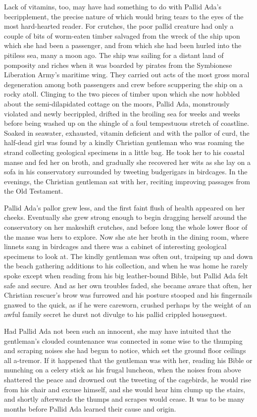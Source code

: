 Lack of vitamins, too, may have had something to do with Pallid Ada's becripplement, the precise nature of which would bring tears to the eyes of the most hard-hearted reader. For crutches, the poor pallid creature had only a couple of bits of worm-eaten timber salvaged from the wreck of the ship upon which she had been a passenger, and from which she had been hurled into the pitiless sea, many a moon ago. The ship was sailing for a distant land of pomposity and riches when it was boarded by pirates from the Symbionese Liberation Army's maritime wing. They carried out acts of the most gross moral degeneration among both passengers and crew before scuppering the ship on a rocky atoll. Clinging to the two pieces of timber upon which she now hobbled about the semi-dilapidated cottage on the moors, Pallid Ada, monstrously violated and newly becrippled, drifted in the broiling sea for weeks and weeks before being washed up on the shingle of a foul tempestuous stretch of coastline. Soaked in seawater, exhausted, vitamin deficient and with the pallor of curd, the half-dead girl was found by a kindly Christian gentleman who was roaming the strand collecting geological specimens in a little bag. He took her to his coastal manse and fed her on broth, and gradually she recovered her wits as she lay on a sofa in his conservatory surrounded by tweeting budgerigars in birdcages. In the evenings, the Christian gentleman sat with her, reciting improving passages from the Old Testament.

Pallid Ada's pallor grew less, and the first faint flush of health appeared on her cheeks. Eventually she grew strong enough to begin dragging herself around the conservatory on her makeshift crutches, and before long the whole lower floor of the manse was hers to explore. Now she ate her broth in the dining room, where linnets sang in birdcages and there was a cabinet of interesting geological specimens to look at. The kindly gentleman was often out, traipsing up and down the beach gathering additions to his collection, and when he was home he rarely spoke except when reading from his big leather-bound Bible, but Pallid Ada felt safe and secure. And as her own troubles faded, she became aware that often, her Christian rescuer's brow was furrowed and his posture stooped and his fingernails gnawed to the quick, as if he were careworn, crushed perhaps by the weight of an awful family secret he durst not divulge to his pallid crippled houseguest.

Had Pallid Ada not been such an innocent, she may have intuited that the gentleman's clouded countenance was connected in some wise to the thumping and scraping noises she had begun to notice, which set the ground floor ceilings all a-tremor. If it happened that the gentleman was with her, reading his Bible or munching on a celery stick as his frugal luncheon, when the noises from above shattered the peace and drowned out the tweeting of the cagebirds, he would rise from his chair and excuse himself, and she would hear him clump up the stairs, and shortly afterwards the thumps and scrapes would cease. It was to be many months before Pallid Ada learned their cause and origin.

